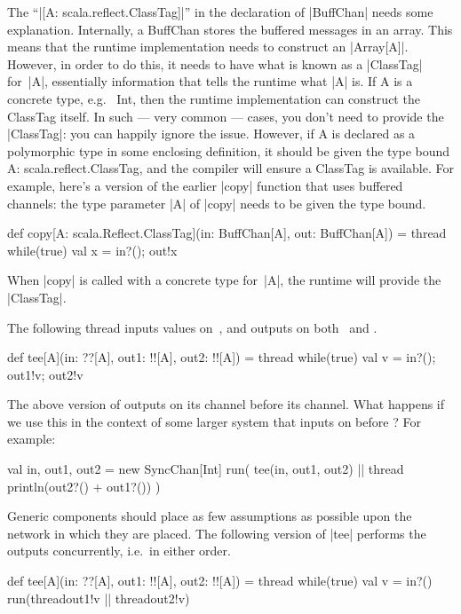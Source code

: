 The ``|[A: scala.reflect.ClassTag]|'' in the declaration of |BuffChan| needs
some explanation. Internally, a {\scalashape BuffChan} stores the buffered
messages in an array.  This means that the runtime implementation needs to
construct an |Array[A]|.  However, in order to do this, it needs to have what
is known as a |ClassTag| for~|A|, essentially information that tells the
runtime what |A| is.  If {\scalashape A} is a concrete type, e.g.~{\scalashape
  Int}, then the runtime implementation can construct the {\scalashape
  ClassTag} itself.  In such --- very common --- cases, you don't need to
provide the |ClassTag|: you can happily ignore the issue.  However, if
{\scalashape A} is declared as a polymorphic type in some enclosing
definition, it should be given the type bound {\scalashape A:
  scala.reflect.ClassTag}, and the compiler will ensure a {\scalashape
  ClassTag} is available.  For example, here's a version of the earlier |copy|
function that uses buffered channels: the type parameter |A| of |copy| needs
to be given the type bound.
%
\begin{scala}
def copy[A: scala.Reflect.ClassTag](in: BuffChan[A], out: BuffChan[A]) = thread{
  while(true){ val x = in?(); out!x }
}
\end{scala}
%
When |copy| is called with a concrete type for~|A|, the runtime will provide
the |ClassTag|. 





The following thread inputs values on~, and outputs on
both~ and .
%
\begin{scala}
def tee[A](in: ??[A], out1: !![A], out2: !![A]) = thread{
  while(true){ val v = in?(); out1!v; out2!v }
}
\end{scala}

The above version of  outputs on its  channel before
its  channel.  What happens if we use this in the context of some
larger system that inputs on  before ?  For example:
\begin{scala}
val in, out1, out2 = new SyncChan[Int]
run( tee(in, out1, out2) || thread{ println(out2?() + out1?()) } )
\end{scala}


Generic components should place as few assumptions as possible upon the
network in which they are placed.  The following version of |tee| performs the
outputs concurrently, i.e.~in either order.
%
\begin{scala}
def tee[A](in: ??[A], out1: !![A], out2: !![A]) = thread{
  while(true){ 
    val v = in?()
    run(thread{out1!v} || thread{out2!v}) 
  }
}
\end{scala}

